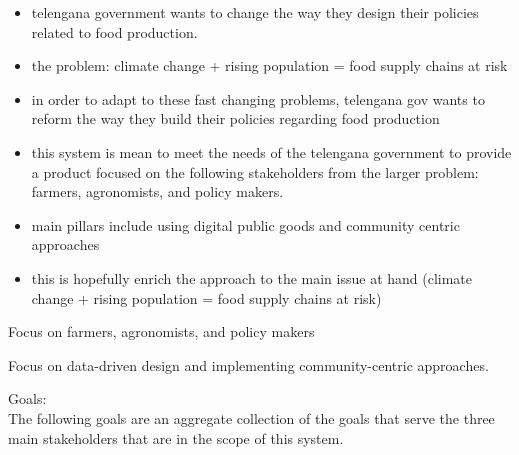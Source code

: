 \begin{itemize}
\item
telengana government wants to change the way they design their policies related to food production. 
\item

the problem: climate change + rising population = food supply chains at risk
\item

in order to adapt to these fast changing problems, telengana gov wants to reform the way they build their policies regarding food production
\item

this system is mean to meet the needs of the telengana government to provide a product focused on the following stakeholders from the larger problem: farmers, agronomists, and policy makers. 
\item
main pillars include using digital public goods and community centric approaches
\item
this is hopefully enrich the approach to the main issue at hand (climate change + rising population = food supply chains at risk)
\end{itemize}
\begin{flushleft}

\medskip
Focus on farmers, agronomists, and policy makers\\
\medskip

Focus on data-driven design and implementing community-centric approaches.\\
\medskip

Goals: \\
The following goals are an aggregate collection of the goals that serve the three main stakeholders that are in the scope of this system.
\end{flushleft}

